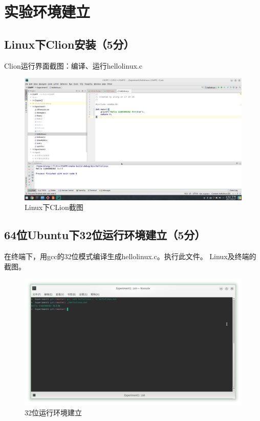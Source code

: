 \section{实验环境建立}
\subsection{Linux下Clion安装（5分）}
Clion运行界面截图：编译、运行hellolinux.c

\begin{figure}[H]
	\centering
	\includegraphics[width=0.55\linewidth]{figures/Linux-Clion}
	\caption{Linux下CLion截图}
	\label{fig:linux-clion}
\end{figure}

\subsection{64位Ubuntu下32位运行环境建立（5分）}

在终端下，用gcc的32位模式编译生成hellolinux.c。执行此文件。
Linux及终端的截图。

\begin{figure}[H]
	\centering
	\includegraphics[width=0.5\linewidth]{figures/hello-m32}
	\caption{32位运行环境建立}
	\label{hello-m32}
\end{figure}

